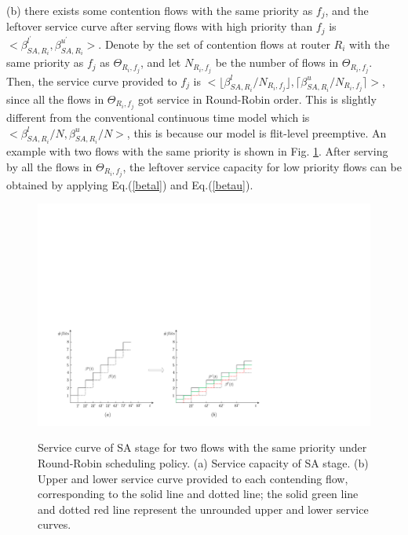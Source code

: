 \documentclass[10pt,journal]{IEEEtran}
\begin{document}
(b) there exists some contention flows with the same priority as $f_j$, and the leftover service curve after serving flows with high priority than $f_j$ is $<\beta_{SA,R_i}^{l^\prime},\beta_{SA,R_i}^{u^\prime}>$. Denote by the set of contention flows at router $R_i$ with the same priority as $f_j$ as $\Theta_{R_i,f_j}$, and let $N_{R_i,f_j}$ be the number of flows in $\Theta_{R_i,f_j}$. Then, the service curve provided to $f_j$ is $<\lfloor\beta^l_{SA,R_i}/N_{R_i,f_j}\rfloor,\lceil\beta^u_{SA,R_i}/N_{R_i,f_j}\rceil>$, since all the flows in $\Theta_{R_i,f_j}$ got service in Round-Robin order. This is slightly different from the conventional continuous time model which is $<\beta^l_{SA,R_i}/N,\beta^u_{SA,R_i}/N>$, this is because our model is flit-level preemptive. An example with two flows with the same priority is shown in Fig. \ref{roundrobin}. After serving by all the flows in $\Theta_{R_i,f_j}$, the leftover service capacity for low priority flows can be obtained by applying Eq.(\ref{betal}) and Eq.(\ref{betau}).
\begin{figure}
  \centering
  \includegraphics[scale=0.5]{figures/RoundRobin.pdf}\\
  \caption{Service curve of SA stage for two flows with the same priority under Round-Robin scheduling policy. (a) Service capacity of SA stage. (b) Upper and lower service curve provided to each contending flow, corresponding to the solid line and dotted line; the solid green line and dotted red line represent the unrounded upper and lower service curves.}\label{roundrobin}
\end{figure}
\end{document}
